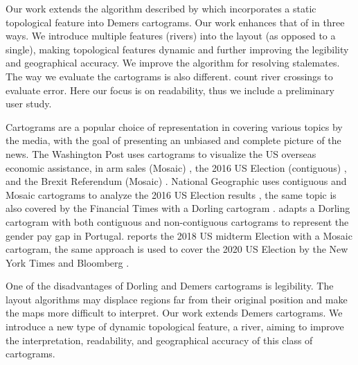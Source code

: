 Our work extends the algorithm described by  which incorporates a static topological feature into Demers cartograms. Our work enhances that of \citeauthor{tong2018cartograms} in three ways. We introduce multiple features (rivers) into the layout (as opposed to a single), making topological features dynamic and further improving the legibility and geographical accuracy. We improve the algorithm for resolving stalemates.  The way we evaluate the cartograms is also different. \citeauthor{tong2018cartograms} count river crossings to evaluate error. Here our focus is on readability, thus we include a preliminary user study.

Cartograms are a popular choice of representation in covering various topics by the media, with the goal of presenting an unbiased and complete picture of the news. The Washington Post uses cartograms to visualize the US overseas economic assistance, in arm sales (Mosaic) \cite{bearak2016Everything}, the 2016 US Election (contiguous) \cite{gamio2016Election}, and the Brexit Referendum (Mosaic) \cite{taylor2016What}. National Geographic uses contiguous and Mosaic cartograms to analyze the 2016 US Election results \cite{miller2016Election}, the same topic is also covered by the Financial Times with a Dorling cartogram \cite{stabe2016Search}.  adapts a Dorling cartogram with both contiguous and non-contiguous cartograms to represent the gender pay gap in Portugal.  reports the 2018 US midterm Election with a Mosaic cartogram, the same approach is used to cover the 2020 US Election by the New York Times \cite{thelearningnetwork2020What} and Bloomberg \cite{mccartney20202020}.




One of the disadvantages of Dorling and Demers cartograms is legibility. The layout algorithms may displace regions far from their original position and make the maps more difficult to interpret. Our work extends Demers cartograms. We introduce a new type of dynamic topological feature, a river, aiming to improve the interpretation, readability, and geographical accuracy of this class of cartograms.